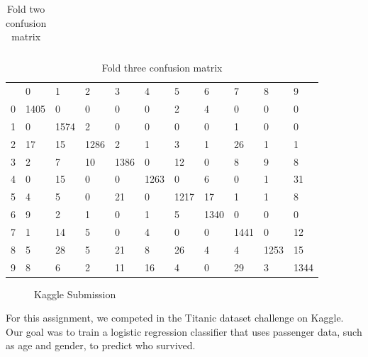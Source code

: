\documentclass[12pt]{report}
\begin{document}
\begin{centering}
\begin{table}[h!]
\begin{tabular}{lllllllllll}
\end{tabular}
\caption{Fold two confusion matrix}
\end{table}

\begin{table}[h!]
\begin{tabular}{lllllllllll}

 & 0 & 1 & 2 & 3 & 4 & 5 & 6 & 7 & 8 & 9 \\
0 & 1405 & 0 & 0 & 0 & 0 & 2 & 4 & 0 & 0 & 0 \\
1 & 0 & 1574 & 2 & 0 & 0 & 0 & 0 & 1 & 0 & 0 \\
2 & 17 & 15 & 1286 & 2 & 1 & 3 & 1 & 26 & 1 & 1 \\
3 & 2 & 7 & 10 & 1386 & 0 & 12 & 0 & 8 & 9 & 8 \\
4 & 0 & 15 & 0 & 0 & 1263 & 0 & 6 & 0 & 1 & 31 \\
5 & 4 & 5 & 0 & 21 & 0 & 1217 & 17 & 1 & 1 & 8 \\
6 & 9 & 2 & 1 & 0 & 1 & 5 & 1340 & 0 & 0 & 0 \\
7 & 1 & 14 & 5 & 0 & 4 & 0 & 0 & 1441 & 0 & 12 \\
8 & 5 & 28 & 5 & 21 & 8 & 26 & 4 & 4 & 1253 & 15 \\
9 & 8 & 6 & 2 & 11 & 16 & 4 & 0 & 29 & 3 & 1344 \\

\end{tabular}
\caption{Fold three confusion matrix}
\end{table}
\end{centering}



\begin{figure}
\centering
{}
\caption{Kaggle Submission}
\end{figure}


For this assignment, we competed in the Titanic dataset challenge on Kaggle. Our goal was to train a logistic regression classifier that uses passenger data, such as age and gender, to predict who
survived.
\end{document}
